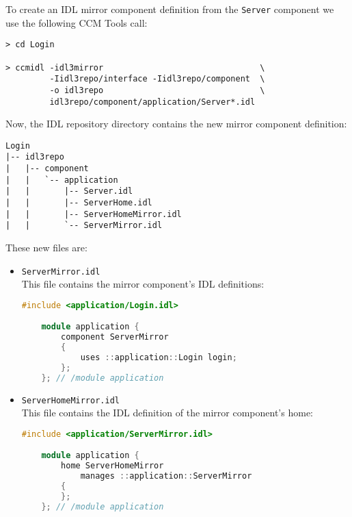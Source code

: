 To create an IDL mirror component definition from the {\tt Server} component we
use the following CCM Tools call: 
\begin{footnotesize}
\begin{verbatim}
> cd Login

> ccmidl -idl3mirror                                \
         -Iidl3repo/interface -Iidl3repo/component  \
         -o idl3repo                                \
         idl3repo/component/application/Server*.idl
\end{verbatim}
\end{footnotesize}

Now, the IDL repository directory contains the new mirror component definition:
\begin{footnotesize}
\begin{verbatim}
Login
|-- idl3repo
|   |-- component
|   |   `-- application
|   |       |-- Server.idl
|   |       |-- ServerHome.idl
|   |       |-- ServerHomeMirror.idl
|   |       `-- ServerMirror.idl
\end{verbatim}
\end{footnotesize}

These new files are:
\begin{itemize}
  \item {\tt ServerMirror.idl} \\
  This file contains the mirror component's IDL definitions:
    \begin{footnotesize}
    \begin{lstlisting}[language=C++]
    #include <application/Login.idl>

    module application {
        component ServerMirror
        {
            uses ::application::Login login;
        };
    }; // /module application
	\end{lstlisting} 
    \end{footnotesize}
  \item {\tt ServerHomeMirror.idl} \\
    This file contains the IDL definition of the mirror component's home:
    \begin{footnotesize}
    \begin{lstlisting}[language=C++]
    #include <application/ServerMirror.idl>

    module application {
        home ServerHomeMirror
            manages ::application::ServerMirror
        {
        };
    }; // /module application
	\end{lstlisting} 
    \end{footnotesize}
\end{itemize}

